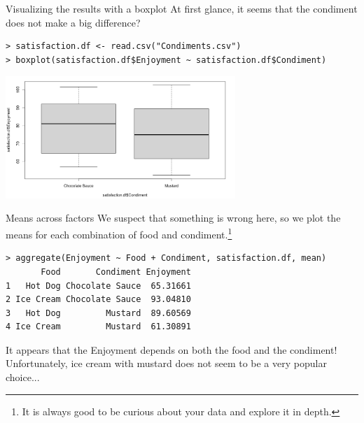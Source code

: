 \begin{frame}[fragile]{Visualizing the results with a boxplot}
  At first glance, it seems that the condiment does not make a big
  difference?

  {\smaller
\begin{verbatim}
> satisfaction.df <- read.csv("Condiments.csv")
> boxplot(satisfaction.df$Enjoyment ~ satisfaction.df$Condiment)
\end{verbatim}}
  
  \begin{center}
    \includegraphics[width=0.65\textwidth]{../img/boxplot_condiment.png}
  \end{center}
\end{frame}

\begin{frame}[fragile]{Means across factors}{}
  We suspect that something is wrong here, so we plot the means for
  each combination of food and condiment.\footnote{It is always good
    to be curious about your data and explore it in depth.}\bigskip

  {\smaller
\begin{verbatim}
> aggregate(Enjoyment ~ Food + Condiment, satisfaction.df, mean)
       Food       Condiment Enjoyment
1   Hot Dog Chocolate Sauce  65.31661
2 Ice Cream Chocolate Sauce  93.04810
3   Hot Dog         Mustard  89.60569
4 Ice Cream         Mustard  61.30891
\end{verbatim}} \bigskip

    It appears that the Enjoyment depends on both the food and the
    condiment! Unfortunately, ice cream with mustard does not seem to
    be a very popular choice...
\end{frame}

